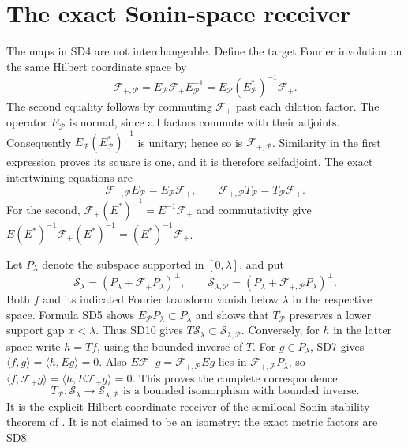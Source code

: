 \documentclass[11pt]{article}
\newcommand{\F}{\mathcal F_+}
\begin{document}
\section{The exact Sonin-space receiver}
The maps in SD4 are not interchangeable. Define the target Fourier
involution on the same Hilbert coordinate space by
\[
 \mathcal F_{+,\mathcal P}=E_{\mathcal P}\F E_{\mathcal P}^{-1}
   =E_{\mathcal P}(E_{\mathcal P}^*)^{-1}\F.                    \tag{SD9}
\]
The second equality follows by commuting $\F$ past each dilation
factor. The operator $E_{\mathcal P}$ is normal, since all factors
commute with their adjoints. Consequently
$E_{\mathcal P}(E_{\mathcal P}^*)^{-1}$ is unitary; hence so is
$\mathcal F_{+,\mathcal P}$. Similarity in the first expression proves its
square is one, and it is therefore selfadjoint. The exact
intertwining equations are
\[
 \mathcal F_{+,\mathcal P}E_{\mathcal P}=E_{\mathcal P}\F,
 \qquad\mathcal F_{+,\mathcal P}T_{\mathcal P}=T_{\mathcal P}\F.
                                                               \tag{SD10}
\]
For the second, $\F(E^*)^{-1}=E^{-1}\F$ and commutativity give
$E(E^*)^{-1}\F(E^*)^{-1}=(E^*)^{-1}\F$.

Let $P_\lambda$ denote the subspace supported in $[0,\lambda]$,
and put
\[
 \mathcal S_\lambda=(P_\lambda+\F P_\lambda)^\perp,
 \qquad
 \mathcal S_{\lambda,\mathcal P}
      =(P_\lambda+\mathcal F_{+,\mathcal P}P_\lambda)^\perp.              \tag{SD11}
\]
Both $f$ and its indicated Fourier transform vanish below $\lambda$
in the respective space. Formula SD5 shows
$E_{\mathcal P}P_\lambda\subset P_\lambda$ and shows that
$T_{\mathcal P}$ preserves a lower support gap $x<\lambda$.
Thus SD10 gives $T\mathcal S_\lambda\subset
\mathcal S_{\lambda,\mathcal P}$.
Conversely, for $h$ in the latter space write $h=Tf$, using the
bounded inverse of $T$. For $g\in P_\lambda$, SD7 gives
$\langle f,g\rangle=\langle h,Eg\rangle=0$.
Also $E\F g=\mathcal F_{+,\mathcal P}Eg$ lies in
$\mathcal F_{+,\mathcal P}P_\lambda$, so
$\langle f,\F g\rangle=\langle h,E\F g\rangle=0$.
This proves the complete correspondence
\[
 \boxed{T_{\mathcal P}:\mathcal S_\lambda
       \longrightarrow\mathcal S_{\lambda,\mathcal P}
       \text{ is a bounded isomorphism with bounded inverse}.}  \tag{SD12}
\]
It is the explicit Hilbert-coordinate receiver of the semilocal
Sonin stability theorem of \cite{CCM}. It is not claimed to be an
isometry: the exact metric factors are SD8.
\end{document}
